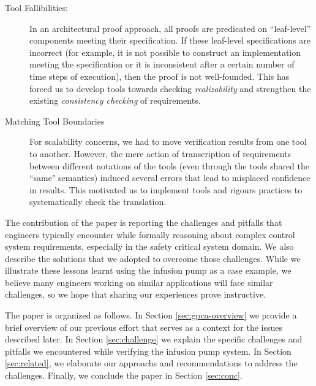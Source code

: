 \begin{description}
    \item[Tool Fallibilities:] In an architectural proof approach, all proofs are predicated on ``leaf-level'' components meeting their specification.  If these leaf-level specifications are incorrect (for example, it is not possible to construct an implementation meeting the specification or it is inconsistent after a certain number of time steps of execution), then the proof is not well-founded.  This has forced us to develop tools towards checking {\em realizability} and strengthen the existing {\em consistency checking} of requirements.
    \item[Matching Tool Boundaries] For scalability concerns, we had to move verification results from one tool to another. However, the mere action of transcription of requirements between different notations of the tools (even through the tools shared the ``same" semantics) induced several errors that lead to misplaced confidence in results. This motivated us to implement tools and rigours practices to systematically check the translation.
\end{description}

The contribution of the paper is reporting the challenges and pitfalls that engineers typically encounter while formally reasoning about complex control system requirements, especially in the safety critical system domain. We also describe the solutions that we adopted to overcome those challenges. While we illustrate these lessons learnt using the infusion pump as a case example, we believe many engineers working on similar applications will face similar challenges, so we hope that sharing our experiences prove instructive. %

The paper is organized as follows. In Section \ref{sec:gpca-overview} we provide a brief overview of our previous effort that serves as a context for the issues described later. In Section \ref{sec:challenge} we explain the specific challenges and pitfalls we encountered while verifying the infusion pump system. In Section \ref{sec:related}, we elaborate our approachs and recommendations to address the challenges. Finally, we conclude the paper in Section \ref{sec:conc}.
\iffalse

